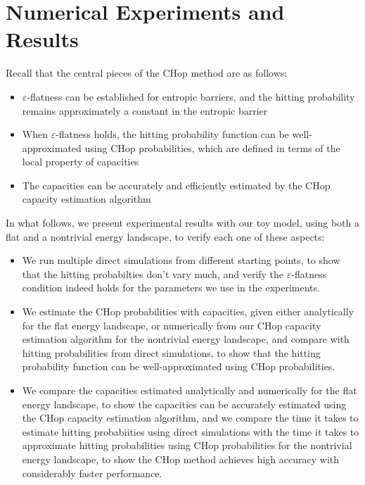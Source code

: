 \documentclass[english, aip, jcp, priprint, graphicx]{revtex4-1}
\theoremstyle{plain}
\theoremstyle{definition}
\theoremstyle{plain}
\begin{document}
\section{Numerical Experiments and Results}\label{sec:experiments}

Recall that the central pieces of the CHop method are as follows:

\begin{itemize}
\item $\varepsilon$-flatness can be established for entropic barriers, and the hitting probability remains approximately a constant in the entropic barrier
\item When $\varepsilon$-flatness holds, the hitting probability function can be well-approximated using CHop probabilities, which are defined in terms of the local property of capacities
\item The capacities can be accurately and efficiently estimated by the CHop capacity estimation algorithm
\end{itemize}

In what follows, we present experimental results with our toy model, using both a flat and a nontrivial energy landscape, to verify each one of these aspects:

\begin{itemize}
\item We run multiple direct simulations from different starting points, to show that the hitting probabilties don't vary much, and verify the $\varepsilon$-flatness condition indeed holds for the parameters we use in the experiments.
\item We estimate the CHop probabilities with capacities, given either analytically for the flat energy landscape, or numerically from our CHop capacity estimation algorithm for the nontrivial energy landscape, and compare with hitting probabilities from direct simulations, to show that the hitting probability function can be well-approximated using CHop probabilities.
\item We compare the capacities estimated analytically and numerically for the flat energy landscape, to show the capacities can be accurately estimated using the CHop capacity estimation algorithm, and we compare the time it takes to estimate hitting probabiities using direct simulations with the time it takes to approximate hitting probabilities using CHop probabilities for the nontrivial energy landscape, to show the CHop method achieves high accuracy with considerably faster performance.
\end{itemize}
\end{document}
